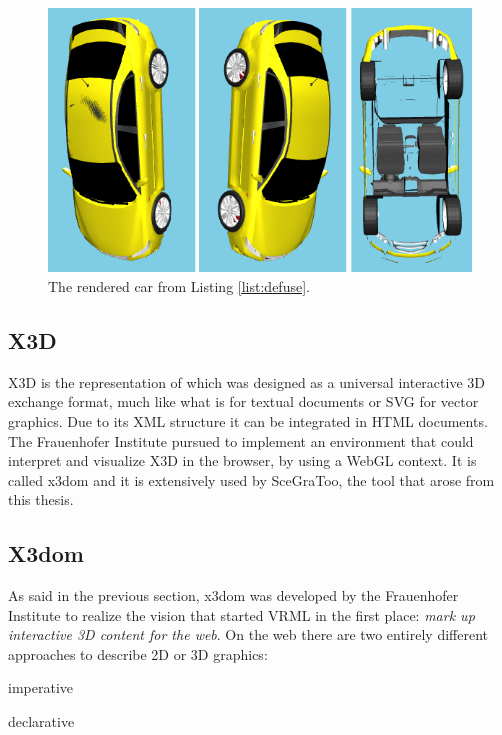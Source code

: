 \begin{figure}
  \centering
  \includegraphics[width=\textwidth]{../assets/car.png}
  \caption{The rendered car from Listing \ref{list:defuse}.}
  \label{fig:defuse}
\end{figure}


\subsection{X3D}
\label{x3d} \gls{X3D} \cite{x3d} is the  representation of  which was designed as a
universal interactive \gls{3D} exchange format, much like what  is for textual
documents or \acrshort{SVG} for vector graphics. Due to its \gls{XML} structure it can be
integrated in \gls{HTML} documents. The Frauenhofer Institute pursued to
implement an environment that could interpret and visualize \gls{X3D} in the browser, by
using a \gls{WebGL} context. It is called x3dom \cite{x3dom} and it is extensively used
by SceGraToo, the tool that arose from this thesis.

\subsection{X3dom}
\label{par:x3dom}

As said in the previous section, x3dom was developed by the Frauenhofer
Institute to realize the vision that started \gls{VRML} in the first place: \emph{mark
up interactive \gls{3D} content for the web}. On the web there are two entirely
different approaches to describe 2D or 3D graphics:

\begin{itemize*}
  \item imperative
  \item declarative
\end{itemize*}

